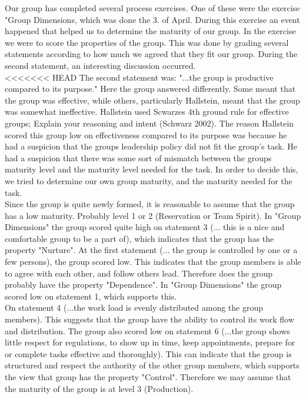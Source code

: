 Our group has completed several process exercises. One of these were the exercise "Group Dimensions, which was done the 3. of April. During this exercise an event happened that helped us to determine the  maturity of our group. In the exercise we were to score 
the properties of the group. This was done by grading several statements according to how much we agreed that they fit our group. During the second statement, an interesting discussion occurred.  
\\
<<<<<<< HEAD
The second statement was: "...the group is productive compared to its purpose." Here the group answered differently. Some meant that the group was effective, while others, particularly Hallstein, meant that the group was somewhat ineffective. Hallstein used Scwarzes 4th ground rule for effective groups; Explain your reasoning and intent (Schwarz 2002). The reason Hallstein scored this group low on effectiveness compared to its purpose was because he had a suspicion that the groups leadership policy did not fit the group's task. He had a suspicion that there was some sort of mismatch between the groups maturity level and the maturity level needed for the task. In order to decide this, we tried to determine our own group maturity, and the maturity needed for the task.  
\\
Since the group is quite newly formed, it is reasonable to assume that the group has a low maturity. Probably level 1 or 2 (Reservation or Team Spirit). In "Group Dimensions" the group scored quite high on statement 3 (... this is a nice and comfortable group to be a part of), which indicates that the group has the property "Nurture". At the first statement (... the group is controlled by one or a few persons), the group scored low. This indicates that the group members is able to agree with each other, and follow others lead. Therefore does the group probably have the property "Dependence". In "Group Dimensions" the group scored low on statement 1, which supports this. 
\\
On statement 4 (...the work load is evenly distributed among the group members). This suggests that the group have the ability to control its work flow and distribution. The group also scored low on statement 6 (...the group shows little respect for regulations, to show up in time, keep appointments, prepare for or complete tasks effective and thoroughly). This can indicate that the group is structured and respect the authority of the other group members, which supports the view that group has the property "Control". Therefore we may assume that the maturity of the group is at level 3 (Production).
